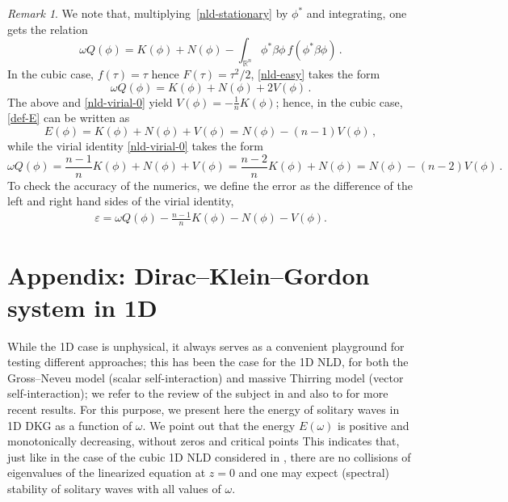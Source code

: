 \documentclass[12pt]{extarticle}
\def\R{\mathbb{R}}
\theoremstyle{plain}
\theoremstyle{remark}
\newtheorem{remark}[lemma]{Remark}
\begin{document}
\begin{remark}\label{remark-nld-simple}
We note that, multiplying~\eqref{nld-stationary} by $\phi^*$ and integrating, one gets the relation
\begin{equation}\label{nld-easy}
    \omega Q(\phi)
    =K(\phi)+N(\phi)
    -\int_{\R^n}\phi^*\beta\phi\,f( \phi^*\beta\phi)\,.
\end{equation}
In the cubic case, $f(\tau)=\tau$ hence
$F(\tau)=\tau^2/2$,
\eqref{nld-easy}
takes the form
\[
    \omega Q(\phi)=K(\phi)+N(\phi)+2V(\phi)\,.
\]
The above and
\eqref{nld-virial-0} yield
$V(\phi)=-\frac{1}{n}K(\phi)$;
hence, in the cubic case,
\eqref{def-E} can be written as
\[
    E(\phi)=
    K(\phi)+N(\phi)+V(\phi)
    =N(\phi) - (n-1) V(\phi)\,,
\]
while the virial identity
\eqref{nld-virial-0}
takes the form
\begin{equation}\label{nld-virial-cubic}
\omega Q(\phi)=\frac{n-1}{n}K(\phi)+N(\phi)+V(\phi) = \frac{n-2}{n}K(\phi)+N(\phi) = N(\phi) - (n-2) V(\phi)\,.
\end{equation}
To check the accuracy of the numerics, we define
the error as the difference of the
left and right hand sides of the virial identity,
\begin{align}
\label{def-varepsilon-nld}
\varepsilon
=\omega Q(\phi)-\frac{n-1}{n}K(\phi)-N(\phi)-V(\phi).
\end{align}
\end{remark}

\section{Appendix:
Dirac--Klein--Gordon
system in 1D}
\label{sect_appendix_1D}


While the 1D case is unphysical,
it always serves as a convenient
playground for testing different approaches;
this has been the case for the
1D NLD, for both the
Gross--Neveu model (scalar self-interaction)
and massive Thirring model
(vector self-interaction);
we refer to the review of the subject in \cite{boussaid2019nonlinear}
and also to \cite{aldunate2023results}
for more recent results.
For this purpose,
we present here the energy
of solitary waves in 1D DKG
as a function of $\omega$.
We point out that
the energy $E(\omega)$
is positive and monotonically decreasing,
without zeros and critical points
This indicates that, just like
in the case of the cubic 1D NLD
considered in
\cite{berkolaiko2012spectral,berkolaiko2015vakhitov},
there are no collisions of eigenvalues
of the linearized equation at $z=0$
and one may expect (spectral) stability
of solitary waves
with all values of $\omega$.
\end{document}
